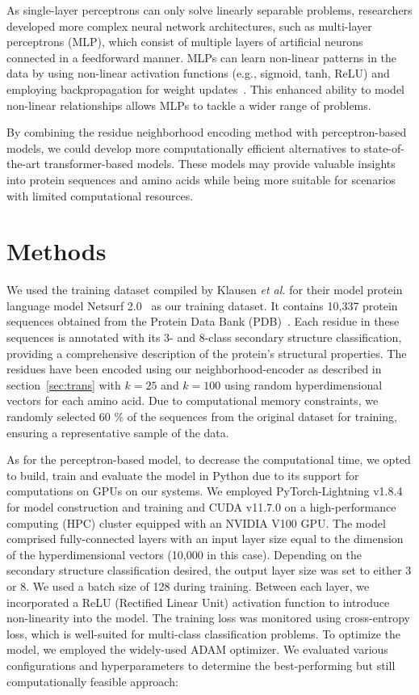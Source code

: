 As single-layer perceptrons can only solve linearly separable problems, researchers developed more complex neural network architectures, such as multi-layer perceptrons (MLP), which consist of multiple layers of artificial neurons connected in a feedforward manner. MLPs can learn non-linear patterns in the data by using non-linear activation functions (e.g., sigmoid, tanh, ReLU) and employing backpropagation for weight updates~\cite{mlp}. This enhanced ability to model non-linear relationships allows MLPs to tackle a wider range of problems.

By combining the residue neighborhood encoding method with perceptron-based models, we could develop more computationally efficient alternatives to state-of-the-art transformer-based models. These models may provide valuable insights into protein sequences and amino acids while being more suitable for scenarios with limited computational resources.

\section{Methods}
We used the training dataset compiled by Klausen \textit{et al.} for their model protein language model Netsurf 2.0~\cite{netsurf} as our training dataset. It contains 10,337 protein sequences obtained from the Protein Data Bank (PDB)~\cite{pdb}. Each residue in these sequences is annotated with its 3- and 8-class secondary structure classification, providing a comprehensive description of the protein's structural properties. The residues have been encoded using our neighborhood-encoder as described in section~\ref{sec:trans} with $k=25$ and $k=100$ using random hyperdimensional vectors for each amino acid. Due to computational memory constraints, we randomly selected 60 \% of the sequences from the original dataset for training, ensuring a representative sample of the data.

As for the perceptron-based model, to decrease the computational time, we opted to build, train and evaluate the model in Python due to its support for computations on GPUs on our systems. We employed PyTorch-Lightning v1.8.4 for model construction and training and CUDA v11.7.0 on a high-performance computing (HPC) cluster equipped with an NVIDIA V100 GPU. The model comprised fully-connected layers with an input layer size equal to the dimension of the hyperdimensional vectors (10,000 in this case). Depending on the secondary structure classification desired, the output layer size was set to either 3 or 8. We used a batch size of 128 during training. Between each layer, we incorporated a ReLU (Rectified Linear Unit) activation function to introduce non-linearity into the model. The training loss was monitored using cross-entropy loss, which is well-suited for multi-class classification problems. To optimize the model, we employed the widely-used ADAM optimizer. We evaluated various configurations and hyperparameters to determine the best-performing but still computationally feasible approach:

